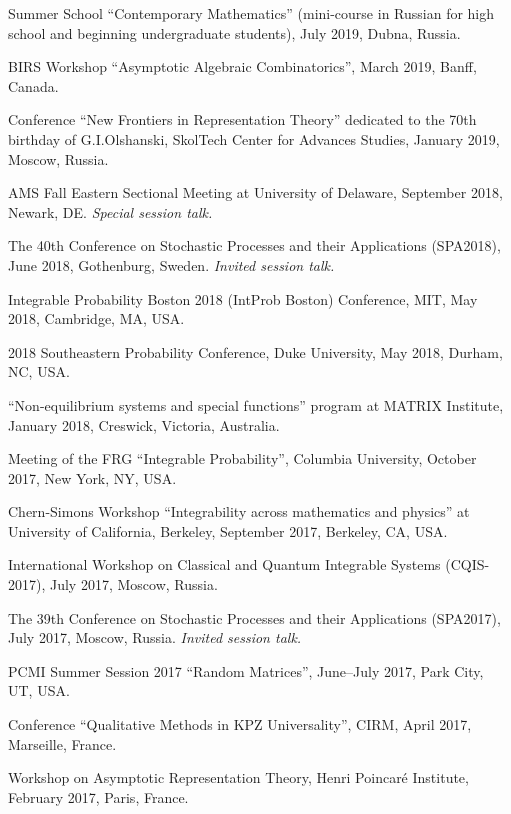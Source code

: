 \documentclass[letterpaper,11pt]{article}
\begin{document}
\begin{etaremune}
		Summer School ``Contemporary Mathematics'' (mini-course in Russian for
		high school and beginning undergraduate students),
		July 2019, Dubna, Russia.
	\item
		BIRS Workshop ``Asymptotic Algebraic Combinatorics'',
		March 2019, Banff, Canada.
	\item Conference ``New Frontiers in Representation Theory'' dedicated to the 70th birthday of G.I.Olshanski, SkolTech Center for Advances Studies, January 2019, Moscow, Russia.
\item AMS Fall Eastern Sectional Meeting
	at University of Delaware,
	September 2018, Newark, DE.
		\emph{Special session talk.}
	\item
    The 40th Conference on Stochastic Processes and their
    Applications (SPA2018), June 2018,
		Gothenburg, Sweden.
		\emph{Invited session talk.}
	\item
		Integrable Probability Boston 2018 (IntProb Boston)
		Conference,
		MIT,
		May 2018,
		Cambridge, MA, USA.
	\item
		2018 Southeastern Probability Conference,
		Duke University,
		May 2018,
		Durham, NC, USA.
	\item
		``Non-equilibrium systems and special functions'' program at MATRIX Institute,
		January 2018,
		Creswick, Victoria, Australia.
	\item
		Meeting of the
		FRG ``Integrable Probability'', Columbia University,
		October 2017, New York, NY, USA.

	\item Chern-Simons Workshop
		``Integrability across mathematics and physics''
		 at University of California, Berkeley,
			September 2017, Berkeley, CA, USA.
	\item
	      International Workshop on Classical and Quantum Integrable
	      Systems (CQIS-2017), July 2017, Moscow, Russia.
	\item
	      The 39th Conference on Stochastic Processes and their
	      Applications (SPA2017), July 2017, Moscow, Russia.
				\emph{Invited session talk.}

	\item
	      PCMI Summer Session 2017 ``Random Matrices'', June--July 2017,
	      Park City, UT, USA.

	\item
	      Conference ``Qualitative Methods in KPZ Universality'', CIRM,
	      April 2017, Marseille, France.

	\item
	      Workshop on Asymptotic Representation Theory, Henri Poincar\'e
	      Institute, February 2017, Paris, France.


\end{etaremune}
\end{document}
